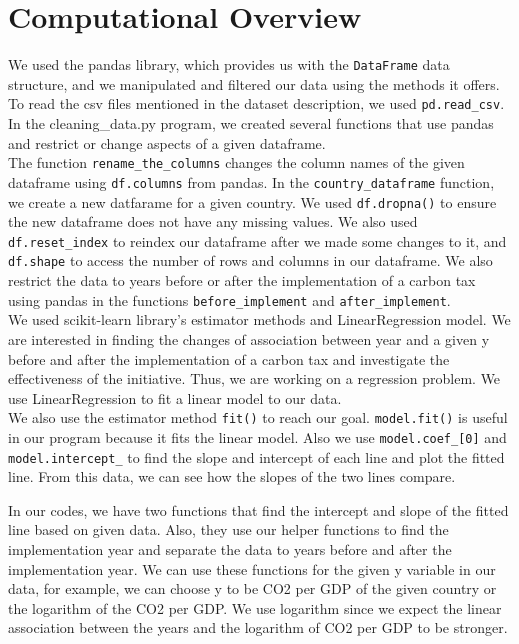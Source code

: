 \documentclass[fontsize=11pt]{article}
\begin{document}
\section*{Computational Overview}
\noindent We used the pandas library, which provides us with the \texttt{DataFrame} data structure, and we manipulated and filtered our data using the methods it offers. To read the csv files mentioned in the dataset description, we used \texttt{pd.read\_csv}. In the cleaning\_data.py program, we created several functions that use pandas and restrict or change aspects of a given dataframe. \\

\noindent The function \texttt{rename\_the\_columns} changes the column names of the given dataframe using \texttt{df.columns} from pandas. In the \texttt{country\_dataframe} function, we create a new datfarame for a given country. We used \texttt{df.dropna()} to ensure the new dataframe does not have any missing values. We also used \texttt{df.reset\_index} to reindex our dataframe after we made some changes to it, and \texttt{df.shape} to access the number of rows and columns in our dataframe. We also restrict the data to years before or after the implementation of a carbon tax using pandas in the functions \texttt{before\_implement} and  \texttt{after\_implement}.\\%



\noindent We used scikit-learn library’s estimator methods and LinearRegression model. We are interested in finding the changes of association between year and a given y before and after the implementation of a carbon tax and investigate the effectiveness of the initiative. Thus, we are working on a regression problem. We use LinearRegression to fit a linear model to our data.\\

\noindent We also use the estimator method \texttt{fit()} to reach our goal.  \texttt{model.fit()} is useful in our program because it fits the linear model.
Also we use \texttt {model.coef\_[0]} and \texttt{model.intercept\_}
to find the slope and intercept of each line and plot the fitted line.
 From this data, we can see how the slopes of the two lines compare.
 \newline

\noindent
In our codes, we have two functions that find the intercept and slope of the fitted line based on given data. Also, they use our helper functions to find the implementation year and separate the data to years before and after the implementation year.
We can use these functions for the given y variable in our data, for example, we can choose y to be CO2 per GDP  of the given country or the logarithm of the CO2 per GDP.
We use logarithm since we expect the linear association between the years and the logarithm of CO2 per GDP to be stronger.\\
\end{document}
